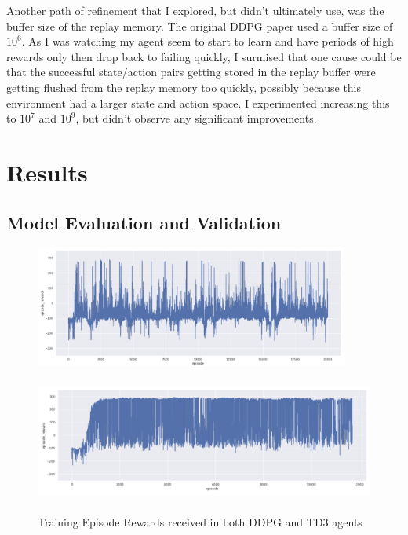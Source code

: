 \documentclass{article}
\begin{document}
Another path of refinement that I explored, but didn't ultimately use, was the buffer size of the replay memory. The original DDPG paper used a buffer size of $10^{6}$. As I was watching my agent seem to start to learn and have periods of high rewards only then drop back to failing quickly, I surmised that one cause could be that the successful state/action pairs getting stored in the replay buffer were getting flushed from the replay memory too quickly, possibly because this environment had a larger state and action space. I experimented increasing this to $10^{7}$ and $10^{9}$, but didn't observe any significant improvements.


\section{Results}
\label{sec:results}

\subsection{Model Evaluation and Validation}

\begin{figure}[h]
\caption{Training Episode Rewards received in both DDPG and TD3 agents}
\centering

\begin{minipage}[t]{.5\linewidth}
\centering
\includegraphics[width=\linewidth, height=4cm]{images/episode_reward_ddpg.png}
\label{fig:a}
\end{minipage}%
\begin{minipage}[t]{.5\linewidth}
\centering
\includegraphics[width=\linewidth, height=4cm]{images/episode_reward_td3.png}
\label{fig:b}
\end{minipage}
\label{fig:episode_rewards_results}
\end{figure}
\end{document}
